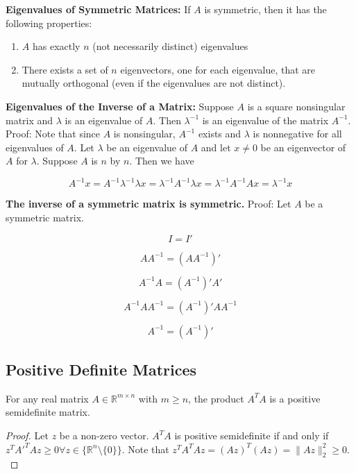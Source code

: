 \textbf{Eigenvalues of Symmetric Matrices:} If \(A\) is symmetric, then it has the following properties:

\begin{enumerate}[1.]

\item \(A\) has exactly \(n\) (not necessarily distinct) eigenvalues

\item There exists a set of \(n\) eigenvectors, one for each eigenvalue, that are mutually orthogonal (even if the eigenvalues are not distinct).

\end{enumerate}

\textbf{Eigenvalues of the Inverse of a Matrix:} Suppose \(A\) is a square nonsingular matrix and \(\lambda\) is an eigenvalue of \(A\). Then \(\lambda^{-1}\) is an eigenvalue of the matrix \(A^{-1}\). Proof: Note that since \(A\) is nonsingular, \(A^{-1}\) exists and \(\lambda\) is nonnegative for all eigenvalues of \(A\). Let \(\lambda\) be an eigenvalue of \(A\) and let \(x \neq 0\) be an eigenvector of \(A\) for \(\lambda\). Suppose \(A\) is \(n\) by \(n\). Then we have

\[
A^{-1}x = A^{-1}\lambda^{-1} \lambda x = \lambda^{-1} A^{-1} \lambda x = \lambda^{-1} A^{-1} A x = \lambda^{-1}x
\]

\textbf{The inverse of a symmetric matrix is symmetric.} Proof: Let \(A\) be a symmetric matrix.

\[
I = I'
\]

\[
A A^{-1} = (A A^{-1})'
\]

\[
A^{-1} A = (A^{-1})'A'
\]

\[
A^{-1} A A^{-1} = (A^{-1})'A A^{-1}
\]

\[
A^{-1} = (A^{-1})'
\]

\subsection{Positive Definite Matrices}

\begin{proposition}\label{linalg.prop.inner.prod.psd}
For any real matrix \(A \in \mathbb{R}^{m \times n}\) with \(m \geq n\), the product \(A^T A\) is a positive semidefinite matrix. 

\end{proposition}

\begin{proof}
Let \(z\) be a non-zero vector. \(A^TA\) is positive semidefinite if and only if \(z^T A'^TA z \geq 0 \forall z \in \{ \mathbb{R}^n \setminus \{0\}\}\). Note that \(z^T A^T A z = (Az)^T(Az) = \lVert Az \rVert_2^2 \geq 0.\)

\end{proof}

